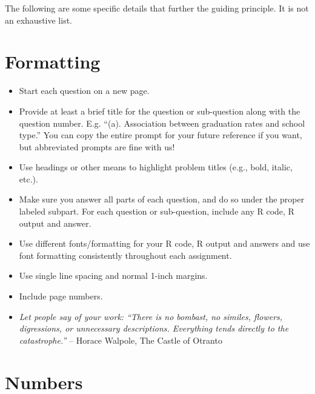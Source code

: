 \documentclass[
  letterpaper,
  DIV=11,
  numbers=noendperiod]{scrreprt}
\providecommand{\tightlist}{%
  \setlength{\itemsep}{0pt}\setlength{\parskip}{0pt}}\usepackage{longtable,booktabs,array}
\begin{document}
The following are some specific details that further the guiding
principle. It is not an exhaustive list.

\section*{Formatting}\label{formatting}


\begin{itemize}
\tightlist
\item
  Start each question on a new page.
\item
  Provide at least a brief title for the question or sub-question along
  with the question number. E.g. ``(a). Association between graduation
  rates and school type.'' You can copy the entire prompt for your
  future reference if you want, but abbreviated prompts are fine with
  us!
\item
  Use headings or other means to highlight problem titles (e.g., bold,
  italic, etc.).
\item
  Make sure you answer all parts of each question, and do so under the
  proper labeled subpart. For each question or sub-question, include any
  R code, R output and answer.
\item
  Use different fonts/formatting for your R code, R output and answers
  and use font formatting consistently throughout each assignment.
\item
  Use single line spacing and normal 1-inch margins.
\item
  Include page numbers.
\item
  \emph{Let people say of your work: ``There is no bombast, no similes,
  flowers, digressions, or unnecessary descriptions. Everything tends
  directly to the catastrophe.''} -- Horace Walpole, The Castle of
  Otranto
\end{itemize}

\section*{Numbers}\label{numbers}

\end{document}
